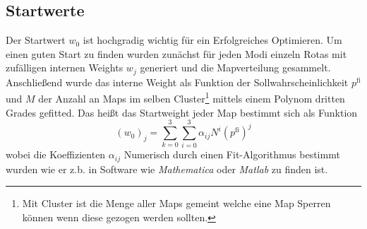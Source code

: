 \subsection{Startwerte}
Der Startwert $w_0$ ist hochgradig wichtig für ein Erfolgreiches Optimieren.
Um einen guten Start zu finden wurden zunächst für jeden Modi einzeln Rotas mit zufälligen internen Weights $w_j$ generiert und die Mapverteilung gesammelt. 
Anschließend wurde das interne Weight als Funktion der Sollwahrscheinlichkeit $p^\text{fi}$ und $M$ der Anzahl an Maps im selben Cluster\footnote[2]{Mit Cluster ist die Menge aller Maps gemeint welche eine Map Sperren können wenn diese gezogen werden sollten.} mittels einem Polynom dritten Grades gefitted. 
Das heißt das Startweight jeder Map bestimmt sich als Funktion 
\begin{equation}
    (w_0)_j = \sum_{k=0}^3\sum_{i=0}^3 \alpha_{ij}N^i(p^\text{fi})^j
\end{equation}
wobei die Koeffizienten $\alpha_{ij}$ Numerisch durch einen Fit-Algorithmus bestimmt wurden wie er z.b. in Software wie \textit{Mathematica} oder \textit{Matlab} zu finden ist.